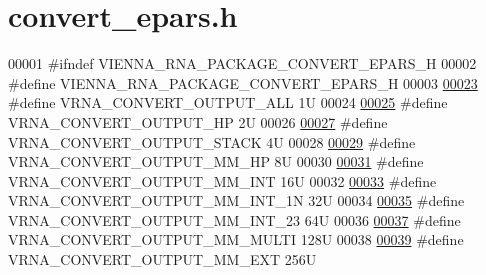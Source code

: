 \hypertarget{convert__epars_8h_source}{}\section{convert\+\_\+epars.\+h}
\label{convert__epars_8h_source}

\begin{DoxyCode}
00001 \textcolor{preprocessor}{#ifndef VIENNA\_RNA\_PACKAGE\_CONVERT\_EPARS\_H}
00002 \textcolor{preprocessor}{#define VIENNA\_RNA\_PACKAGE\_CONVERT\_EPARS\_H}
00003 
\hypertarget{convert__epars_8h_source.tex_l00023}{}\hyperlink{group__energy__parameters__convert_ga8dc6aee5a806c49b71557152f9616bc4}{00023} \textcolor{preprocessor}{#define VRNA\_CONVERT\_OUTPUT\_ALL           1U}
00024 
\hypertarget{convert__epars_8h_source.tex_l00025}{}\hyperlink{group__energy__parameters__convert_gaf66fe2cb11dfcfd32d791049c254a8a4}{00025} \textcolor{preprocessor}{#define VRNA\_CONVERT\_OUTPUT\_HP            2U}
00026 
\hypertarget{convert__epars_8h_source.tex_l00027}{}\hyperlink{group__energy__parameters__convert_gad23522d63f8d4c50d5a5deee9bee3ef2}{00027} \textcolor{preprocessor}{#define VRNA\_CONVERT\_OUTPUT\_STACK         4U}
00028 
\hypertarget{convert__epars_8h_source.tex_l00029}{}\hyperlink{group__energy__parameters__convert_gaa892c7b4957459090f3e08da298cc347}{00029} \textcolor{preprocessor}{#define VRNA\_CONVERT\_OUTPUT\_MM\_HP         8U}
00030 
\hypertarget{convert__epars_8h_source.tex_l00031}{}\hyperlink{group__energy__parameters__convert_ga4ff223fb1f9c62cd92d9ab811ad03d55}{00031} \textcolor{preprocessor}{#define VRNA\_CONVERT\_OUTPUT\_MM\_INT        16U}
00032 
\hypertarget{convert__epars_8h_source.tex_l00033}{}\hyperlink{group__energy__parameters__convert_gaf5d3743219f83c6348155cd81e755bbb}{00033} \textcolor{preprocessor}{#define VRNA\_CONVERT\_OUTPUT\_MM\_INT\_1N     32U}
00034 
\hypertarget{convert__epars_8h_source.tex_l00035}{}\hyperlink{group__energy__parameters__convert_ga78382ec622ba99e0ac2262317bdd7316}{00035} \textcolor{preprocessor}{#define VRNA\_CONVERT\_OUTPUT\_MM\_INT\_23     64U}
00036 
\hypertarget{convert__epars_8h_source.tex_l00037}{}\hyperlink{group__energy__parameters__convert_gae67af9f1cdf7baf2865481282a5d1034}{00037} \textcolor{preprocessor}{#define VRNA\_CONVERT\_OUTPUT\_MM\_MULTI      128U}
00038 
\hypertarget{convert__epars_8h_source.tex_l00039}{}\hyperlink{group__energy__parameters__convert_gaf14ead7ef1fdbe725ade653750fc51e3}{00039} \textcolor{preprocessor}{#define VRNA\_CONVERT\_OUTPUT\_MM\_EXT        256U}

\end{DoxyCode}
